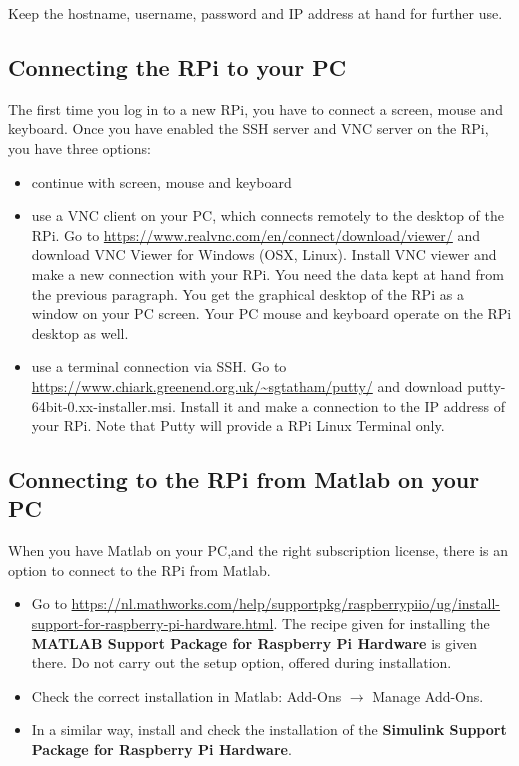 Keep the hostname, username, password and IP address at hand for further use.

\subsection{Connecting the RPi to your PC}

The first time you log in to a new RPi, you have to connect a screen, mouse and keyboard. Once you have enabled the SSH server and VNC server on the RPi, you have three options:

\begin{itemize}
	\item continue with screen, mouse and keyboard
	\item use a VNC client on your PC, which connects remotely to the desktop of the RPi. Go to \url{https://www.realvnc.com/en/connect/download/viewer/}  and download VNC Viewer for Windows (OSX, Linux). Install VNC viewer and make a new connection with your RPi. You need the data kept at hand from the previous paragraph. You get the graphical desktop of the RPi as a window on your PC screen. Your PC mouse and keyboard operate on the RPi desktop as well.
	\item use a terminal connection via SSH. Go to \url{https://www.chiark.greenend.org.uk/~sgtatham/putty/} and download \textsf{putty-64bit-0.xx-installer.msi}. Install it and make a connection to the IP address of your RPi. Note that Putty will provide a RPi Linux Terminal only.
\end{itemize}

\subsection{Connecting to the RPi from Matlab on your PC }

When you have Matlab on your PC,and the right subscription license, there is an option to connect to the RPi from Matlab.  

\begin{itemize}
	\item Go to \url{https://nl.mathworks.com/help/supportpkg/raspberrypiio/ug/install-support-for-raspberry-pi-hardware.html}. The recipe given for installing the \textbf{MATLAB Support Package for Raspberry Pi Hardware} is given there. Do not carry out the setup option, offered during installation.
	\item Check the correct installation in Matlab: Add-Ons $\rightarrow$ Manage Add-Ons.
	\item In a similar way, install and check the installation of the \textbf{Simulink Support Package for Raspberry Pi Hardware}.
\end{itemize}

